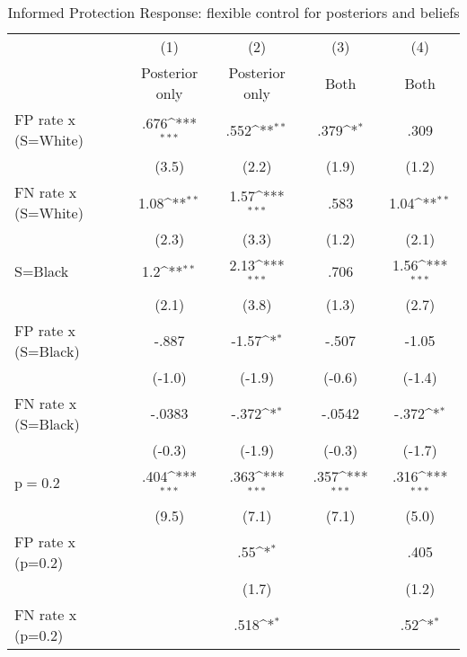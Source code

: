 \begin{table}[htbp]\centering
\def\sym#1{\ifmmode^{#1}\else\(^{#1}\)\fi}
\caption{Informed Protection Response: flexible control for posteriors and beliefs}
\begin{tabular}{l*{4}{c}}
\hline\hline
                &\multicolumn{1}{c}{(1)}&\multicolumn{1}{c}{(2)}&\multicolumn{1}{c}{(3)}&\multicolumn{1}{c}{(4)}\\
                &\multicolumn{1}{c}{Posterior only}&\multicolumn{1}{c}{Posterior only}&\multicolumn{1}{c}{Both}&\multicolumn{1}{c}{Both}\\
\hline
FP rate x (S=White)&     .676\sym{***}&     .552\sym{**} &     .379\sym{*}  &     .309         \\
                &    (3.5)         &    (2.2)         &    (1.9)         &    (1.2)         \\
FN rate x (S=White)&     1.08\sym{**} &     1.57\sym{***}&     .583         &     1.04\sym{**} \\
                &    (2.3)         &    (3.3)         &    (1.2)         &    (2.1)         \\
S=Black         &      1.2\sym{**} &     2.13\sym{***}&     .706         &     1.56\sym{***}\\
                &    (2.1)         &    (3.8)         &    (1.3)         &    (2.7)         \\
FP rate x (S=Black)&    -.887         &    -1.57\sym{*}  &    -.507         &    -1.05         \\
                &   (-1.0)         &   (-1.9)         &   (-0.6)         &   (-1.4)         \\
FN rate x (S=Black)&   -.0383         &    -.372\sym{*}  &   -.0542         &    -.372\sym{*}  \\
                &   (-0.3)         &   (-1.9)         &   (-0.3)         &   (-1.7)         \\
p$=$0.2         &     .404\sym{***}&     .363\sym{***}&     .357\sym{***}&     .316\sym{***}\\
                &    (9.5)         &    (7.1)         &    (7.1)         &    (5.0)         \\
FP rate x (p=0.2)&                  &      .55\sym{*}  &                  &     .405         \\
                &                  &    (1.7)         &                  &    (1.2)         \\
FN rate x (p=0.2)&                  &     .518\sym{*}  &                  &      .52\sym{*}  \\

\end{tabular}
\end{table}
